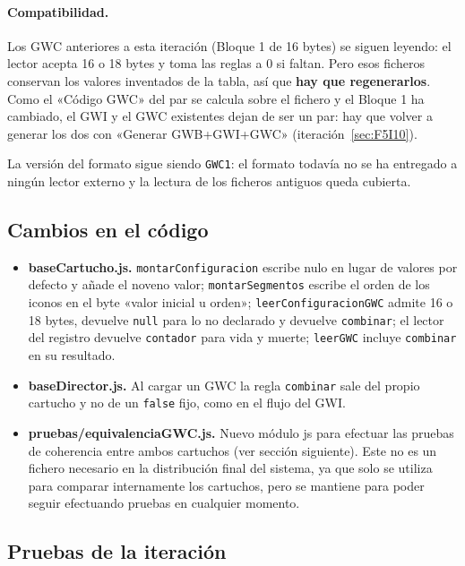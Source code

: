 \paragraph{Compatibilidad.} Los GWC anteriores a esta iteración (Bloque 1 de 16 bytes) se siguen leyendo: el lector acepta 16 o 18 bytes y toma las reglas a 0 si faltan. Pero esos ficheros conservan los valores inventados de la tabla, así que \textbf{hay que regenerarlos}. Como el «Código GWC» del par se calcula sobre el fichero y el Bloque 1 ha cambiado, el GWI y el GWC existentes dejan de ser un par: hay que volver a generar los dos con «Generar GWB+GWI+GWC» (iteración~\ref{sec:F5I10}).

La versión del formato sigue siendo \texttt{GWC1}: el formato todavía no se ha entregado a ningún lector externo y la lectura de los ficheros antiguos queda cubierta.

\subsection{Cambios en el código}
\label{sec:F5I13Codigo}

\begin{itemize}
	\item \textbf{baseCartucho.js.} \texttt{montarConfiguracion} escribe nulo en lugar de valores por defecto y añade el noveno valor; \texttt{montarSegmentos} escribe el orden de los iconos en el byte «valor inicial u orden»; \texttt{leerConfiguracionGWC} admite 16 o 18 bytes, devuelve \texttt{null} para lo no declarado y devuelve \texttt{combinar}; el lector del registro devuelve \texttt{contador} para vida y muerte; \texttt{leerGWC} incluye \texttt{combinar} en su resultado.
	\item \textbf{baseDirector.js.} Al cargar un GWC la regla \texttt{combinar} sale del propio cartucho y no de un \texttt{false} fijo, como en el flujo del GWI.
	\item \textbf{pruebas/equivalenciaGWC.js.} Nuevo módulo js para efectuar las pruebas de coherencia entre ambos cartuchos (ver sección siguiente). Este no es un fichero necesario en la distribución final del sistema, ya que solo se utiliza para comparar internamente los cartuchos, pero se mantiene para poder seguir efectuando pruebas en cualquier momento.
\end{itemize}

\subsection{Pruebas de la iteración}
\label{sec:F5I13Pruebas}

